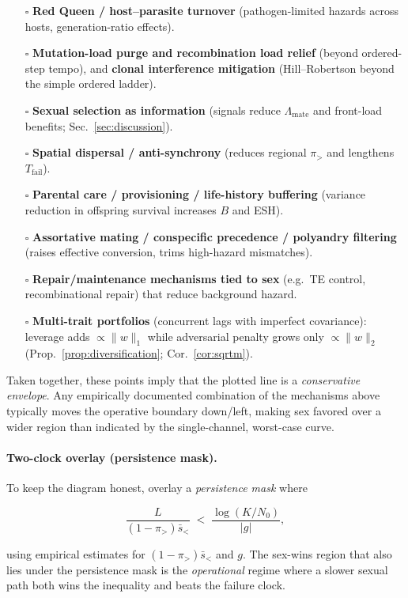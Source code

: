 \documentclass[11pt]{article}
\theoremstyle{upright}
\begin{document}
\begin{itemize}[leftmargin=1.25em]
\item[$\square$] \textbf{Red Queen / host–parasite turnover} (pathogen-limited hazards across hosts, generation-ratio effects).
\item[$\square$] \textbf{Mutation-load purge and recombination load relief} (beyond ordered-step tempo), and
\textbf{clonal interference mitigation} (Hill–Robertson beyond the simple ordered ladder).
\item[$\square$] \textbf{Sexual selection as information} (signals reduce $\Lambda_{\mathrm{mate}}$ and front-load benefits; Sec.~\ref{sec:discussion}).
\item[$\square$] \textbf{Spatial dispersal / anti-synchrony} (reduces regional $\pi_{>}$ and lengthens $T_{\mathrm{fail}}$).
\item[$\square$] \textbf{Parental care / provisioning / life-history buffering} (variance reduction in offspring survival increases $B$ and ESH).
\item[$\square$] \textbf{Assortative mating / conspecific precedence / polyandry filtering} (raises effective conversion, trims high-hazard mismatches).
\item[$\square$] \textbf{Repair/maintenance mechanisms tied to sex} (e.g.\ TE control, recombinational repair) that reduce background hazard.
\item[$\square$] \textbf{Multi-trait portfolios} (concurrent lags with imperfect covariance): leverage adds $\propto\|w\|_1$ while adversarial penalty grows only $\propto\|w\|_2$ (Prop.~\ref{prop:diversification}; Cor.~\ref{cor:sqrtm}).
\end{itemize}

\noindent Taken together, these points imply that the plotted line is a \emph{conservative envelope}. Any empirically
documented combination of the mechanisms above typically moves the operative boundary down/left, making sex favored over a
wider region than indicated by the single-channel, worst-case curve.

\paragraph{Two-clock overlay (persistence mask).}
To keep the diagram honest, overlay a \emph{persistence mask} where

$$
\frac{L}{(1-\pi_{>})\bar s_{<}} \;<\; \frac{\log(K/N_0)}{|g|},
$$

using empirical estimates for $(1-\pi_{>})\bar s_{<}$ and $g$. The sex-wins region that also lies under the persistence mask is the \emph{operational} regime where a slower sexual path both wins the inequality and beats the failure clock.
\end{document}
